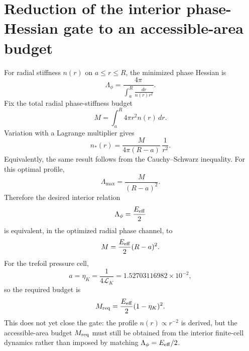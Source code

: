 \section{Reduction of the interior phase-Hessian gate to an accessible-area budget}
For radial stiffness \(n(r)\) on \(a\le r\le R\), the minimized phase Hessian is
\[
  \Lambda_\phi
  =
  \frac{4\pi}
       {\displaystyle\int_a^R\frac{dr}{n(r)r^2}}.
\]
Fix the total radial phase-stiffness budget
\[
  M=\int_a^R4\pi r^2 n(r)\,dr.
\]
Variation with a Lagrange multiplier gives
\[
  n_*(r)
  =
  \frac{M}{4\pi(R-a)}\,\frac{1}{r^2}.
\]
Equivalently, the same result follows from the Cauchy--Schwarz inequality.
For this optimal profile,
\[
  \Lambda_{\max}
  =
  \frac{M}{(R-a)^2}.
\]
Therefore the desired interior relation
\[
  \Lambda_\phi=\frac{E_{\rm eff}}{2}
\]
is equivalent, in the optimized radial phase channel, to
\[
  M
  =
  \frac{E_{\rm eff}}{2}(R-a)^2.
\]
For the trefoil pressure cell,
\[
  a=\eta_K=\frac{1}{4\mathcal L_K}=1.52703116982\times10^{-2},
\]
so the required budget is
\[
  M_{\rm req}
  =
  \frac{E_{\rm eff}}{2}(1-\eta_K)^2.
\]
This does not yet close the gate: the profile \(n(r)\propto r^{-2}\) is derived,
but the accessible-area budget \(M_{\rm req}\) must still be obtained from the
interior finite-cell dynamics rather than imposed by matching
\(\Lambda_\phi=E_{\rm eff}/2\).
